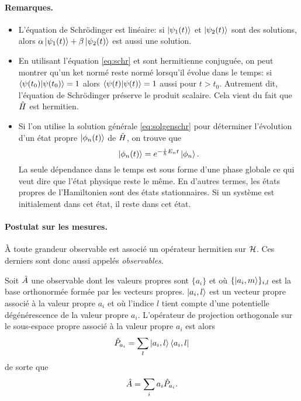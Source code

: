 \documentclass[11pt,a4paper,oneside]{article}
\begin{document}
\paragraph{Remarques.}
\begin{itemize}[label=\tb]
    \item L'équation de Schrödinger est linéaire: si $\ket{\psi_1(t)}$ et $\ket{\psi_2(t)}$ sont des solutions, alors $\alpha\ket{\psi_1(t)}+\beta\ket{\psi_2(t)}$ est aussi une solution.
    \item En utilisant l'équation \eqref{eq:schr} et sont hermitienne conjuguée, on peut montrer qu'un ket normé reste normé lorsqu'il évolue dans le temps: si $\braket{\psi(t_0)}=1$ alors $\braket{\psi(t)}=1$ aussi pour $t>t_0$. Autrement dit, l'équation de Schrödinger préserve le produit scalaire. Cela vient du fait que $\hat{H}$ est hermitien.
    \item Si l'on utilise la solution générale \eqref{eq:solgenschr} pour déterminer l'évolution d'un état propre $\ket{\phi_n(t)}$ de $\hat{H}$, on trouve que
    \begin{equation}
        \ket{\phi_n(t)}=e^{-\frac{i}{\hbar}E_n t}\ket{\phi_n}.
    \end{equation}
    La seule dépendance dans le temps est sous forme d'une phase globale ce qui veut dire que l'état physique reste le même. En d'autres termes, les états propres de l'Hamiltonien sont des états stationnaires. Si un système est initialement dans cet état, il reste dans cet état.
\end{itemize}


\paragraph{Postulat sur les mesures.} À toute grandeur observable est associé un opérateur hermitien sur $\mathcal{H}$. Ces derniers sont donc aussi appelés \emph{observables}. 

Soit $\hat{A}$ une observable dont les valeurs propres sont $\{a_i\}$ et où $\{\ket{a_i,m}\}_{i,l}$ est la base orthonormée formée par les vecteurs propres. $\ket{a_i,l}$ est un vecteur propre associé à la valeur propre $a_i$ et où l'indice $l$ tient compte d'une potentielle dégénérescence de la valeur propre $a_i$. L'opérateur de projection orthogonale sur le sous-espace propre associé à la valeur propre $a_i$ est alors
\begin{equation}
    \hat{P}_{a_i} = \sum_{l}\ket{a_i,l}\bra{a_i,l}
\end{equation}
de sorte que
\begin{equation}
    \hat{A} = \sum_{i} a_i\hat{P}_{a_i}.
\end{equation}
\end{document}
